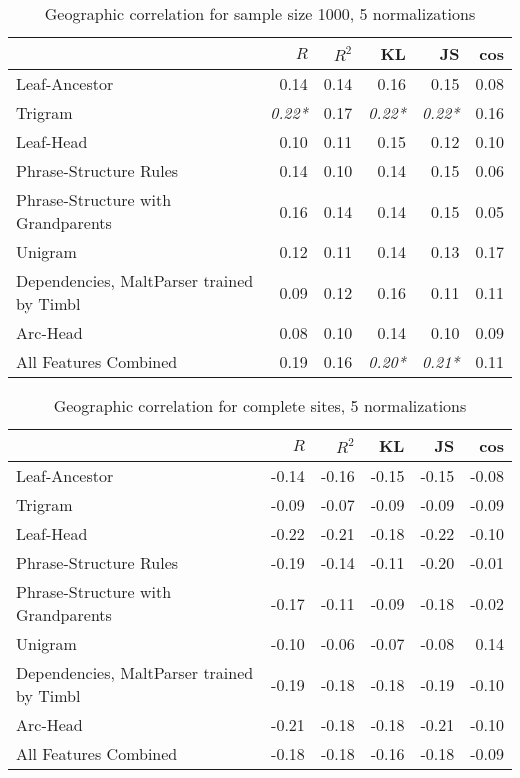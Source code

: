 \begin{table}
\begin{tabular}{l|rrrrr}
& $R$ & $R^2$ & KL & JS & cos  \\ \hline
  Leaf-Ancestor&0.14 & 0.14 & 0.16 & 0.15 & 0.08\\
  Trigram&\textit{0.22*} & 0.17 & \textit{0.22*} & \textit{0.22*} & 0.16\\
  Leaf-Head&0.10 & 0.11 & 0.15 & 0.12 & 0.10\\
  Phrase-Structure Rules&0.14 & 0.10 & 0.14 & 0.15 & 0.06\\
  Phrase-Structure with Grandparents&0.16 & 0.14 & 0.14 & 0.15 & 0.05\\
  Unigram&0.12 & 0.11 & 0.14 & 0.13 & 0.17\\
  Dependencies, MaltParser trained by Timbl&0.09 & 0.12 & 0.16 & 0.11 & 0.11\\
  Arc-Head&0.08 & 0.10 & 0.14 & 0.10 & 0.09\\
  All Features Combined&0.19 & 0.16 & \textit{0.20*} & \textit{0.21*} & 0.11\\
\end{tabular}
 \caption{Geographic correlation for sample size 1000, 5
   normalizations}
 \label{cor-5-1000}
\end{table}

\begin{table}
\begin{tabular}{l|rrrrr}
& $R$ & $R^2$ & KL & JS & cos  \\ \hline
  Leaf-Ancestor&-0.14 & -0.16 & -0.15 & -0.15 & -0.08\\
  Trigram&-0.09 & -0.07 & -0.09 & -0.09 & -0.09\\
  Leaf-Head&-0.22 & -0.21 & -0.18 & -0.22 & -0.10\\
  Phrase-Structure Rules&-0.19 & -0.14 & -0.11 & -0.20 & -0.01\\
  Phrase-Structure with Grandparents&-0.17 & -0.11 & -0.09 & -0.18 & -0.02\\
  Unigram&-0.10 & -0.06 & -0.07 & -0.08 & 0.14\\
  Dependencies, MaltParser trained by Timbl&-0.19 & -0.18 & -0.18 & -0.19 & -0.10\\
  Arc-Head&-0.21 & -0.18 & -0.18 & -0.21 & -0.10\\
  All Features Combined&-0.18 & -0.18 & -0.16 & -0.18 & -0.09\\
\end{tabular}
 \caption{Geographic correlation for complete sites, 5 normalizations}
 \label{cor-5-full}
\end{table}

